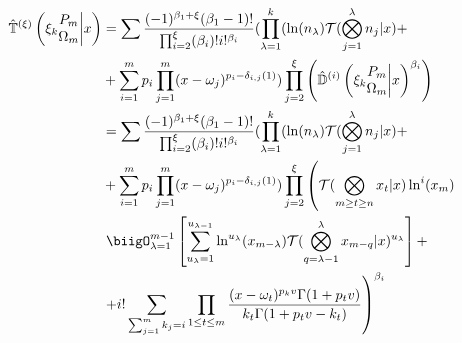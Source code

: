 \begin{align}
      \hat{\mathbb{T}}^{(\xi)}\left( \xi_k \begin{matrix} P_m \\
      \Omega_m \end{matrix} \bigg| x  \right) &= \sum \frac{(-1)^{
      \beta_1 + \xi}(\beta_1 -1)!}{\prod_{i=2}^\xi (\beta_i)!i!^{\beta_i
      }} (\prod_{\lambda = 1}^k (\ln(n_\lambda) \mathcal{T}(\bigotimes_{
      j=1}^\lambda n_j |x) + \\
      &+\sum_{i=1}^m p_i \prod_{j=1}^m (x-\omega_j)^{p_i-\delta_{i, 
      j}(1)} )\prod_{j=2}^\xi \left(\hat{\mathbb{D}}^{(i)}\left( \xi_k
      \begin{matrix} P_m \\ \Omega_m \end{matrix} \bigg| x  \right)^{
      \beta_i}\right)\\
      &= \sum \frac{(-1)^{\beta_1 + \xi}(\beta_1 -1)!}{\prod_{i=2}^\xi
      (\beta_i)!i!^{\beta_i}} (\prod_{\lambda = 1}^k (\ln(n_\lambda) 
      \mathcal{T}(\bigotimes_{j=1}^\lambda n_j |x) + \\
      &+\sum_{i=1}^m p_i \prod_{j=1}^m (x-\omega_j)^{p_i-\delta_{i, 
      j}(1)} )\prod_{j=2}^\xi \left(\mathcal{T}(\bigotimes_{m \geq t 
      \geq n}x_t| x) \ln^i (x_m) \right.\\
      &\left. \biigO_{\lambda = 1}^{m-1} \left[\sum_{u_{\lambda}=1}^{
      u_{\lambda-1}}\ln^{u_{\lambda}}(x_{m-\lambda}) \mathcal{T}(
      \bigotimes_{q = \lambda-1}^\lambda x_{m-q} |x)^{u_{\lambda}} 
      \right] + \right.\\
      &\left.+ i! \sum_{\sum_{j=1}^m k_j = i}\prod_{1 \leq t \leq
      m} \frac{(x - \omega_t)^{p_k v}\Gamma(1+p_t v)}{k_t\Gamma(1+
      p_t v - k_t)}\right)^{\beta_i}
\end{align}

